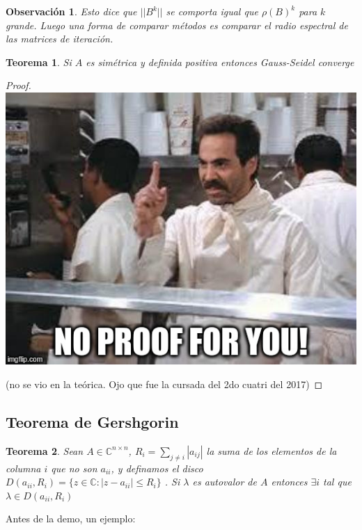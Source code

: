 \documentclass[10pt,a4paper,final]{report}
\newtheorem{theorem}{Teorema}
\newtheorem{observation}{Observación}
\def\C{\mathbb{C}}
\begin{document}
\begin{observation}
	Esto dice que $||B^k||$ se comporta igual que $\rho(B)^k$ para $k$ grande. Luego una forma de comparar métodos es comparar el radio espectral de las matrices de iteración.
\end{observation}

\begin{theorem}
	Si $A$ es simétrica y definida positiva entonces Gauss-Seidel converge 
\end{theorem}

\begin{proof}
	\includegraphics[scale=0.5]{noproof.jpg}
	
	(no se vio en la teórica. Ojo que fue la cursada del 2do cuatri del 2017)
\end{proof}


\subsection*{Teorema de Gershgorin}

\begin{theorem}
	Sean $A \in \C^{n\times n}$, $R_i = \displaystyle \sum_{j \neq i} |a_{ij}|$ la suma de los elementos de la columna $i$ que no son $a_{ii}$, y definamos el disco $D(a_{ii},R_i) = \{z \in  \C : |z- a_{ii}| \leq R_i\}$ . Si $\lambda$ es autovalor de $A$ entonces $\exists i$ tal que $\lambda \in D(a_{ii},R_i)$
\end{theorem}

Antes de la demo, un ejemplo:
\end{document}
